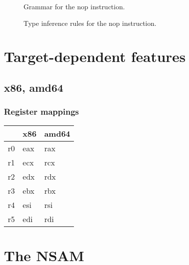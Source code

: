 \begin{figure}[H]
	\centering


	\caption{Grammar for the {\Iformat nop} instruction.}
	\label{fig:nstar-instructionset-other-nop-grammar}
\end{figure}

\begin{figure}[H]
	\centering


	\caption{Type inference rules for the {\Iformat nop} instruction.}
	\label{fig:nstar-instructionset-other-nop-typerules}
\end{figure}

\chapter{Target-dependent features}\label{chap:nstar-specific}

\section{x86, amd64}\label{sec:nstar-specific-x86amd64}

\subsection{Register mappings}\label{subsec:nstar-specific-x86amd64-registers}

\begin{tabularx}{\textwidth}{Y Y Y}
	\toprule
	\nstar & x86 & amd64 \\
	\midrule
	r0     & eax & rax   \\
	r1     & ecx & rcx   \\
	r2     & edx & rdx   \\
	r3     & ebx & rbx   \\
	r4     & esi & rsi   \\
	r5     & edi & rdi   \\
	\bottomrule
\end{tabularx}

\chapter{The NSAM}\label{chap:nstar-nsam}

